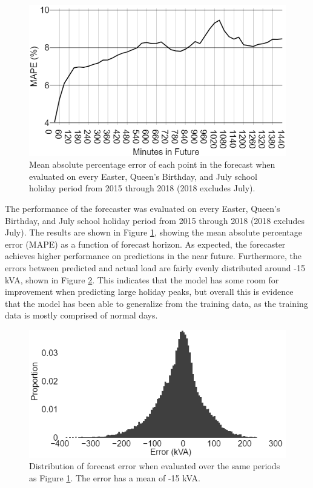 \documentclass[conference]{IEEEtran}
\begin{document}
\begin{figure}[htbp]
	\centerline{\includegraphics[width=.40\textwidth]{images/bruny_mape.png}}
	\caption{Mean absolute percentage error of each point in the forecast when evaluated on every Easter, Queen's Birthday, and July school holiday period from 2015 through 2018 (2018 excludes July).}
	\label{fig:bruny_mape}
\end{figure}

The performance of the forecaster was evaluated on every Easter, Queen's Birthday, and July school holiday period from 2015 through 2018 (2018 excludes July).
The results are shown in Figure \ref{fig:bruny_mape}, showing the mean absolute percentage error (MAPE) as a function of forecast horizon.
As expected, the forecaster achieves higher performance on predictions in the near future.
Furthermore, the errors between predicted and actual load are fairly evenly distributed around -15 kVA, shown in Figure \ref{fig:bruny_hist}.
This indicates that the model has some room for improvement when predicting large holiday peaks, but overall this is evidence that the model has been able to generalize from the training data, as the training data is mostly comprised of normal days.

\begin{figure}[htbp]
	\centerline{\includegraphics[width=.35\textwidth]{images/errors_histogram.png}}
	\caption{Distribution of forecast error when evaluated over the same periods as Figure \ref{fig:bruny_mape}.
			 The error has a mean of -15 kVA.}
	\label{fig:bruny_hist}
\end{figure}
\end{document}
